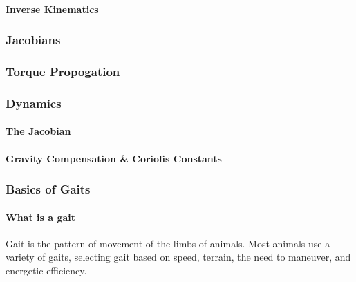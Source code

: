             \paragraph*{Inverse Kinematics}

        \subsubsection{Jacobians}

        \subsubsection{Torque Propogation}

        \subsubsection{Dynamics}
            \paragraph*{The Jacobian}

            \paragraph*{Gravity Compensation \& Coriolis Constants}

        \subsubsection{Basics of Gaits}
            \paragraph*{What is a gait}
            Gait is the pattern of movement of the limbs of animals. Most animals use a variety of gaits, selecting gait based on speed, terrain, the need to maneuver, and energetic efficiency. \cite{wikipedia_2018_Gaits} 

